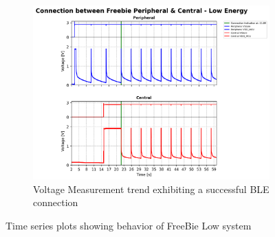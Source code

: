 \begin{figure}[H]
\begin{center}
\begin{subfigure}{0.5\linewidth}
            \includegraphics[width=\linewidth]{chapters/Results/Connection_Freebie_low.png}
            \caption{Voltage Measurement trend exhibiting a successful BLE connection}
            \label{fig:freebie_low_conn}
        \end{subfigure}    
    \end{center}
    \caption{\centering Time series plots showing behavior of FreeBie Low system}
\end{figure}
